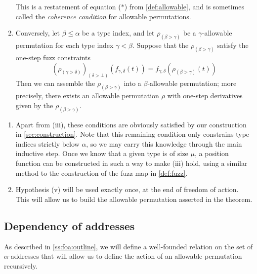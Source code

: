 \begin{enumerate}
    This is a restatement of equation (\( \ast \)) from \cref{def:allowable}, and is sometimes called the \emph{coherence condition} for allowable permutations.
    \item Conversely, let \( \beta \leq \alpha \) be a type index, and let \( \rho_{(\beta > \gamma)} \) be a \( \gamma \)-allowable permutation for each type index \( \gamma < \beta \).
    Suppose that the \( \rho_{(\beta > \gamma)} \) satisfy the one-step fuzz constraints
    \[ (\rho_{(\gamma >\delta)})_{(\delta > \bot)}(f_{\gamma,\delta}(t)) = f_{\gamma,\delta}(\rho_{(\beta > \gamma)}(t)) \]
    Then we can assemble the \( \rho_{(\beta > \gamma)} \) into a \( \beta \)-allowable permutation; more precisely, there exists an allowable permutation \( \rho \) with one-step derivatives given by the \( \rho_{(\beta > \gamma)} \).
\end{enumerate}

\begin{remarks}
    \begin{enumerate}
        \item Apart from (iii), these conditions are obviously satisfied by our construction in \cref{sec:construction}.
        Note that this remaining condition only constrains type indices strictly below \( \alpha \), so we may carry this knowledge through the main inductive step.
        Once we know that a given type is of size \( \mu \), a position function can be constructed in such a way to make (iii) hold, using a similar method to the construction of the fuzz map in \cref{def:fuzz}.
        \item Hypothesis (v) will be used exactly once, at the end of freedom of action.
        This will allow us to build the allowable permutation asserted in the theorem.
    \end{enumerate}
\end{remarks}

\subsection{Dependency of addresses}

As described in \cref{ss:foa:outline}, we will define a well-founded relation on the set of \( \alpha \)-addresses that will allow us to define the action of an allowable permutation recursively.

